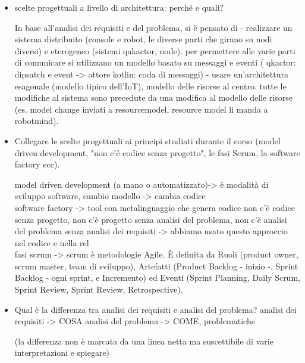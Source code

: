 \newpage

\begin{itemize}

\section{DOMANDE}

\item scelte progettuali a livello di architettura: perché e quali?

In base all'analisi dei requisiti e del problema, si è pensato di 
    - realizzare un sistema distribuito (console e robot, le diverse parti che girano su nodi diversi) e eterogeneo (sistemi qakactor, node). per permettere alle varie parti di comunicare si utilizzano un modello basato su messaggi e eventi ( qkactor: dipsatch e event -> attore kotlin: coda di messaggi)
    - usare un'architettura esagonale (modello tipico dell'IoT), modello delle risorse al centro. tutte le modifiche al sistema sono precedute da una modifica al modello delle risorse (es. model change inviati a resourcemodel, resource model li manda a robotmind). 

\item  Collegare le scelte progettuali ai principi studiati durante il corso (model driven development, "non c'é codice senza progetto", le fasi Scrum, la software factory ecc).

model driven development (a mano o automatizzato)-> è modalità di sviluppo software, cambio modello -> cambia codice \\
software factory -> tool con metalinguaggio che genera codice 
non c'è codice senza progetto, non c'è progetto senza analisi del problema, non c'è analisi del problema senza analisi dei requisiti -> abbiamo usato questo approccio nel codice e nella rel\\
fasi scrum -> scrum è metodologie Agile. È  definita da Ruoli (product owner, scrum master, team di sviluppo), Artefatti (Product Backlog - inizio -, Sprint Backlog - ogni sprint, e Incremento) ed Eventi (Sprint Planning, Daily Scrum, Sprint Review, Sprint Review, Retrospective).\\
 
\item Qual è la differenza tra analisi dei requisiti e analisi del problema? 
analisi dei requisiti -> COSA
analisi del problema -> COME, problematiche

(la differenza non è marcata da una linea netta ma suscettibile di varie interpretazioni e spiegare)


\end{itemize}
